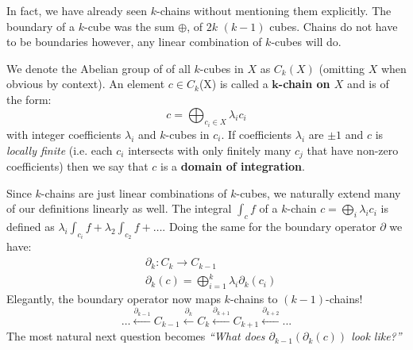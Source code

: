 In fact, we have already seen $k$-chains without mentioning them explicitly.
The boundary of a $k$-cube was the sum $\oplus$, of $2k$ $(k-1)$ cubes.
Chains do not have to be boundaries however, any linear combination of $k$-cubes will do.


\begin{definition}
We denote the Abelian group of of all $k$-cubes in $X$ as $C_k(X)$ (omitting $X$ when obvious by context).
An element $c \in C_k$(X) is called a \textbf{$\boldsymbol{k}$-chain on $X$} and is of the form:
\begin{equation}
	c = \bigoplus_{c_i \in X} \lambda_i c_i
\end{equation}
with integer coefficients $\lambda_i$ and  $k$-cubes in $c_i$.
If coefficients $\lambda_i$ are $\pm 1$ and $c$ is \emph{locally finite} (i.e. each $c_i$ intersects with only finitely many $c_j$ that have non-zero coefficients) then we say that $c$ is a \textbf{domain of integration}.
\end{definition}


		
Since $k$-chains are just linear combinations of $k$-cubes, we naturally extend many of our definitions linearly as well.
The integral $\int_c f$ of a $k$-chain $c=\bigoplus_i \lambda_i c_i$ is defined as $\lambda_i \int_{c_i} f  + \lambda_2 \int_{c_2} f + \ldots$.
Doing the same for the boundary operator $\partial$ we have:
\begin{align*}
	&\partial_k: C_k \to C_{k-1} \\
	&\partial_k(c) = \bigoplus_{i=1}^k \lambda_i \partial_k(c_i)
\end{align*}
Elegantly, the boundary operator now maps $k$-chains to $(k-1)$-chains!
\begin{equation}
	\ldots \xleftarrow{\partial_{k-1}} C_{k-1} \xleftarrow{\partial_{k}} C_k \xleftarrow{\partial_{k+1}} C_{k+1} \xleftarrow{\partial_{k+2}} ...
\end{equation}
The most natural next question becomes \emph{``What does $\partial_{k-1}( \partial_k ( c ))$ look like?''}



